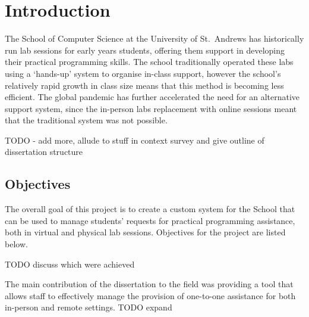 \chapter{Introduction}

The School of Computer Science at the University of St.\ Andrews has historically run lab sessions for early years students, offering them support in developing their practical programming skills. The school traditionally operated these labs using a ‘hands-up’ system to organise in-class support, however the school's relatively rapid growth in class size means that this method is becoming less efficient. The global pandemic has further accelerated the need for an alternative support system, since the in-person labs replacement with online sessions meant that the traditional system was not possible. 

TODO - add more, allude to stuff in context survey and  give outline of dissertation structure

\section{Objectives}

The overall goal of this project is to create a custom system for the School that can be used to manage students' requests for practical programming assistance, both in virtual and physical lab sessions. Objectives for the project are listed below. 

TODO discuss which were achieved

The main contribution of the dissertation to the field was providing a tool that allows staff to effectively manage the provision of one-to-one assistance for both in-person and remote settings. TODO expand

